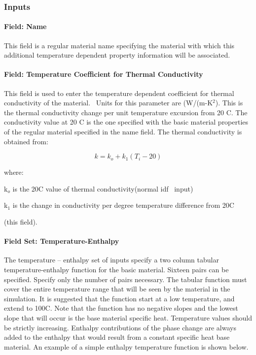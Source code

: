 \subsubsection{Inputs}\label{inputs-5-030}

\paragraph{Field: Name}\label{field-name-5-024}

This field is a regular material name specifying the material with which this additional temperature dependent property information will be associated.

\paragraph{Field: Temperature Coefficient for Thermal Conductivity}\label{field-temperature-coefficient-for-thermal-conductivity}

This field is used to enter the temperature dependent coefficient for thermal conductivity of the material.~ Units for this parameter are (W/(m-K\(^{2}\)). This is the thermal conductivity change per unit temperature excursion from 20 C. The conductivity value at 20 C is the one specified with the basic material properties of the regular material specified in the name field. The thermal conductivity is obtained from:

\begin{equation}
k = {k_o} + {k_1}({T_i} - 20)
\end{equation}

where:

k\(_{o}\) is the 20C value of thermal conductivity(normal idf~ input)

k\(_{1}\) is the change in conductivity per degree temperature difference from 20C

(this field).

\paragraph{Field Set: Temperature-Enthalpy}\label{field-set-temperature-enthalpy}

The temperature -- enthalpy set of inputs specify a two column tabular temperature-enthalpy function for the basic material. Sixteen pairs can be specified. Specify only the number of pairs necessary. The tabular function must cover the entire temperature range that will be seen by the material in the simulation. It is suggested that the function start at a low temperature, and extend to 100C. Note that the function has no negative slopes and the lowest slope that will occur is the base material specific heat. Temperature values should be strictly increasing. Enthalpy contributions of the phase change are always added to the enthalpy that would result from a constant specific heat base material. An example of a simple enthalpy temperature function is shown below.

